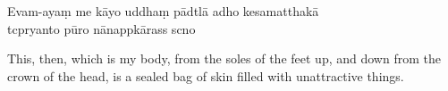 Evam-ayaṃ me kāyo uddhaṃ pādtlā adho kesamatthakā\\
tcpryanto pūro nānappkārass scno

\begin{english}
  This, then, which is my body, from the soles of the feet up, and down from the crown of the head, is a sealed bag of skin filled with unattractive things.
\end{english}

\clearpage

